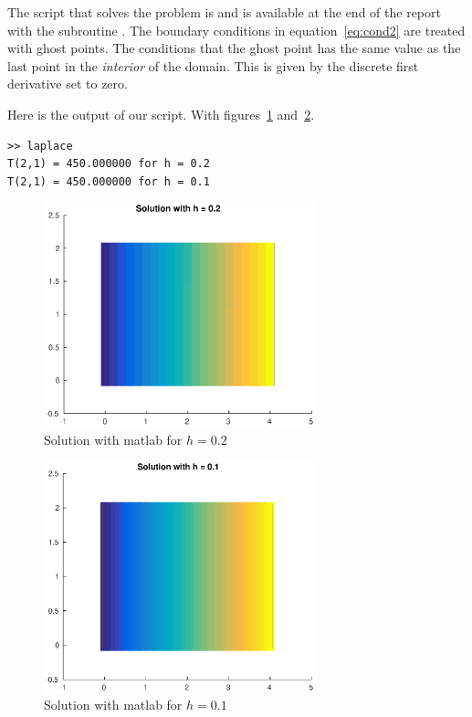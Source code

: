 


The script that solves the problem is  and is available at the end of the report with the subroutine . The boundary conditions in equation~\eqref{eq:cond2} are treated with ghost points. The conditions that the ghost point has the same value as the last point in the \textit{interior} of the domain. This is given by the discrete first derivative set to zero. 

Here is the output of our script. With figures~\ref{fig:h02} and~\ref{fig:h01}.

\begin{lstlisting}
>> laplace
T(2,1) = 450.000000 for h = 0.2 
T(2,1) = 450.000000 for h = 0.1
\end{lstlisting}

\begin{figure}[!h]
\centering
\includegraphics[width = 0.7\textwidth]{./h02.eps}
\caption{Solution with matlab for $h = 0.2$}
\label{fig:h02}
\end{figure}

\begin{figure}[!h]
\centering
\includegraphics[width = 0.7\textwidth]{./h01.eps}
\caption{Solution with matlab for $h = 0.1$}
\label{fig:h01}
\end{figure}

\FloatBarrier
